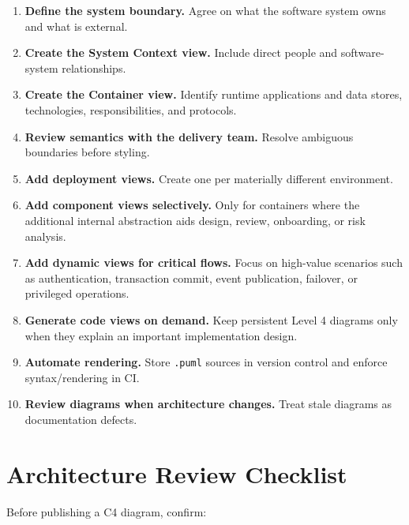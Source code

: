 \documentclass[11pt]{article}
\newcommand{\code}[1]{\texttt{#1}}
\begin{document}
\begin{enumerate}
  \item \textbf{Define the system boundary.} Agree on what the software system owns and what is external.
  \item \textbf{Create the System Context view.} Include direct people and software-system relationships.
  \item \textbf{Create the Container view.} Identify runtime applications and data stores, technologies, responsibilities, and protocols.
  \item \textbf{Review semantics with the delivery team.} Resolve ambiguous boundaries before styling.
  \item \textbf{Add deployment views.} Create one per materially different environment.
  \item \textbf{Add component views selectively.} Only for containers where the additional internal abstraction aids design, review, onboarding, or risk analysis.
  \item \textbf{Add dynamic views for critical flows.} Focus on high-value scenarios such as authentication, transaction commit, event publication, failover, or privileged operations.
  \item \textbf{Generate code views on demand.} Keep persistent Level 4 diagrams only when they explain an important implementation design.
  \item \textbf{Automate rendering.} Store \code{.puml} sources in version control and enforce syntax/rendering in CI.
  \item \textbf{Review diagrams when architecture changes.} Treat stale diagrams as documentation defects.
\end{enumerate}

\section{Architecture Review Checklist}

Before publishing a C4 diagram, confirm:
\end{document}
